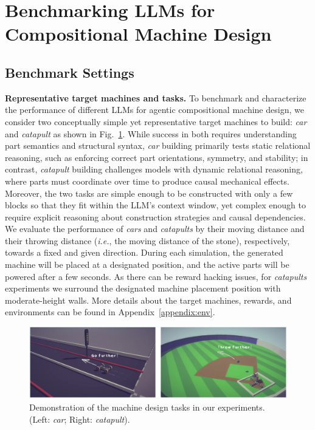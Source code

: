 \documentclass{article} %
\makeatletter
\newcommand*{\ie}{{\it i.e.}\@\xspace}
\theoremstyle{plain}
\theoremstyle{definition}
\makeatother
\begin{document}
\vspace{-2mm}
\section{Benchmarking LLMs for Compositional Machine Design} \label{sec:agentic}
\vspace{-1.5mm}


\subsection{Benchmark Settings}
\vspace{-1.5mm}

\textbf{Representative target machines and tasks.} To benchmark and characterize the performance of different LLMs for agentic compositional machine design, we consider two conceptually simple yet representative target machines to build: \textit{car} and \textit{catapult} as shown in Fig.~\ref{fig:task_demo}. While success in both requires understanding part semantics and structural syntax, \textit{car} building primarily tests static relational reasoning, such as enforcing correct part orientations, symmetry, and stability; in contrast, \textit{catapult} building challenges models with dynamic relational reasoning, where parts must coordinate over time to produce causal mechanical effects. Moreover, the two tasks are simple enough to be constructed with only a few blocks so that they fit within the LLM’s context window, yet complex enough to require explicit reasoning about construction strategies and causal dependencies. We evaluate the performance of \textit{cars} and \textit{catapults} by their moving distance and their throwing distance (\ie, the moving distance of the stone), respectively, towards a fixed and given direction. During each simulation, the generated machine will be placed at a designated position, and the active parts will be powered after a few seconds. As there can be reward hacking issues, for \textit{catapults} experiments we surround the designated machine placement position with moderate-height walls. More details about the target machines, rewards, and environments can be found in Appendix~\ref{appendix:env}. 


\begin{figure}[t!]
  \centering
  \vspace{-3mm}
  \includegraphics[width=\linewidth]{figures/environment_intro_cropped.pdf}
  \captionsetup{font=footnotesize} %
  \vspace{-6.5mm}
  \caption{\footnotesize Demonstration of the machine design tasks in our experiments. (Left: \textit{car}; Right: \textit{catapult}).}
  \label{fig:task_demo}
  \vspace{-1.5mm}
\end{figure}
\end{document}
